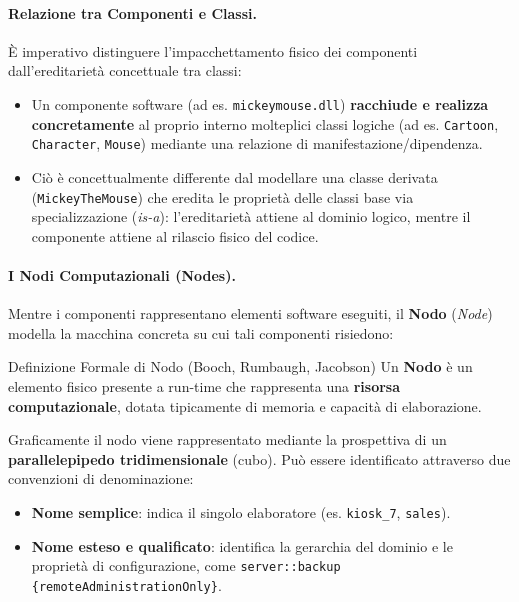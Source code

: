 \documentclass[12pt]{extarticle}
\begin{document}
\paragraph{Relazione tra Componenti e Classi.}
È imperativo distinguere l'impacchettamento fisico dei componenti dall'ereditarietà concettuale tra classi:
\begin{itemize}
    \item Un componente software (ad es. \texttt{mickeymouse.dll}) \textbf{racchiude e realizza concretamente} al proprio interno molteplici classi logiche (ad es. \texttt{Cartoon}, \texttt{Character}, \texttt{Mouse}) mediante una relazione di manifestazione/dipendenza.
    \item Ciò è concettualmente differente dal modellare una classe derivata (\texttt{MickeyTheMouse}) che eredita le proprietà delle classi base via specializzazione (\textit{is-a}): l'ereditarietà attiene al dominio logico, mentre il componente attiene al rilascio fisico del codice.
\end{itemize}

\paragraph{I Nodi Computazionali (Nodes).}
Mentre i componenti rappresentano elementi software eseguiti, il \textbf{Nodo} (\textit{Node}) modella la macchina concreta su cui tali componenti risiedono:
\begin{cbox}{Definizione Formale di Nodo (Booch, Rumbaugh, Jacobson)}
\noindent Un \textbf{Nodo} è un elemento fisico presente a run-time che rappresenta una \textbf{risorsa computazionale}, dotata tipicamente di memoria e capacità di elaborazione.
\end{cbox}

\noindent Graficamente il nodo viene rappresentato mediante la prospettiva di un \textbf{parallelepipedo tridimensionale} (cubo). Può essere identificato attraverso due convenzioni di denominazione:
\begin{itemize}
    \item \textbf{Nome semplice}: indica il singolo elaboratore (es. \texttt{kiosk\_7}, \texttt{sales}).
    \item \textbf{Nome esteso e qualificato}: identifica la gerarchia del dominio e le proprietà di configurazione, come \texttt{server::backup \{remoteAdministrationOnly\}}.
\end{itemize}
\end{document}
